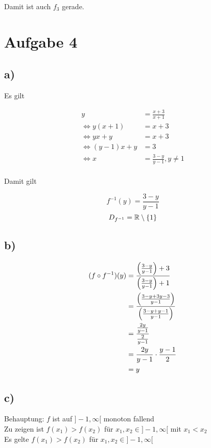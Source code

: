 \documentclass[a4paper, 11pt]{article}
\begin{document}
Damit ist auch \(f_3\) gerade.

\section{Aufgabe 4}
\label{sec:orgf28a89d}
\subsection{a)}
\label{sec:orgbd0028c}
Es gilt

\begin{align*}
    y &= \frac{x+3}{x+1} \\
    \Leftrightarrow y(x+1) &= x+3 \\
    \Leftrightarrow yx+y &= x+3 \\
    \Leftrightarrow (y-1)x+y &= 3 \\
    \Leftrightarrow x &= \frac{3-y}{y-1}, y \neq 1 \\
\end{align*}

Damit gilt

$$ f^{-1}(y) = \frac{3-y}{y-1} $$
$$ D_{f^{-1}} = \mathbb{R} \setminus \{1\} $$

\subsection{b)}
\label{sec:org635a954}
\begin{align*}
    (f \circ f^{-1})(y) &= \frac{\left(\frac{3-y}{y-1}\right)+3}{\left(\frac{3-y}{y-1}\right)+1} \\
    &= \frac{\left(\frac{3-y + 3y-3}{y-1}\right)}{\left(\frac{3-y + y-1}{y-1}\right)} \\
    &= \frac{\frac{2y}{y-1}}{\frac{2}{y-1}} \\
    &= \frac{2y}{y-1} \cdot \frac{y-1}{2} \\
    &= y \\
\end{align*}

\subsection{c)}
\label{sec:orge54e506}
Behauptung: \(f\) ist auf \(]-1, \infty[\) monoton fallend \\

Zu zeigen ist \(f(x_1) > f(x_2)\) für \(x_1, x_2 \in ]-1, \infty[\) mit \(x_1 < x_2\) \\

Es gelte \(f(x_1) > f(x_2)\) für \(x_1, x_2 \in ]-1, \infty[\)
\end{document}
